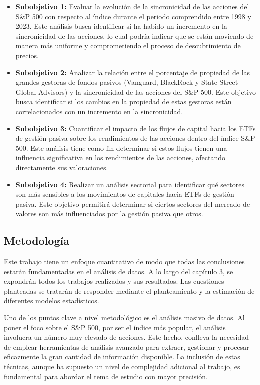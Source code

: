 \documentclass[12pt,a4paper]{article}
\begin{document}
\begin{itemize}
\item \textbf{Subobjetivo 1:} Evaluar la evolución de la sincronicidad de las acciones del S\&P 500 con respecto al índice durante el periodo comprendido entre 1998 y 2023. Este análisis busca identificar si ha habido un incremento en la sincronicidad de las acciones, lo cual podría indicar que se están moviendo de manera más uniforme y comprometiendo el proceso de descubrimiento de precios.

\item \textbf{Subobjetivo 2:} Analizar la relación entre el porcentaje de propiedad de las grandes gestoras de fondos pasivos (Vanguard, BlackRock y State Street Global Advisors) y la sincronicidad de las acciones del S\&P 500. Este objetivo busca identificar si los cambios en la propiedad de estas gestoras están correlacionados con un incremento en la sincronicidad.

\item \textbf{Subobjetivo 3:} Cuantificar el impacto de los flujos de capital hacia los ETFs de gestión pasiva sobre los rendimientos de las acciones dentro del índice S\&P 500. Este análisis tiene como fin determinar si estos flujos tienen una influencia significativa en los rendimientos de las acciones, afectando directamente sus valoraciones.

\item \textbf{Subobjetivo 4:} Realizar un análisis sectorial para identificar qué sectores son más sensibles a los movimientos de capitales hacia ETFs de gestión pasiva. Este objetivo permitirá determinar si ciertos sectores del mercado de valores son más influenciados por la gestión pasiva que otros.
\end{itemize}

\subsection*{Metodología}

Este trabajo tiene un enfoque cuantitativo de modo que todas las conclusiones estarán fundamentadas en el análisis de datos. A lo largo del capítulo 3, se expondrán todos los trabajos realizados y sus resultados. Las cuestiones planteadas se tratarán de responder mediante el planteamiento y la estimación de diferentes modelos estadísticos.

Uno de los puntos clave a nivel metodológico es el análisis masivo de datos. Al poner el foco sobre el S\&P 500, por ser el índice más popular, el análisis involucra un número muy elevado de acciones. Este hecho, conlleva la necesidad de emplear herramientas de análisis avanzado para extraer, gestionar y procesar eficazmente la gran cantidad de información disponible. La inclusión de estas técnicas, aunque ha supuesto un nivel de complejidad adicional al trabajo, es fundamental para abordar el tema de estudio con mayor precisión.
\end{document}
